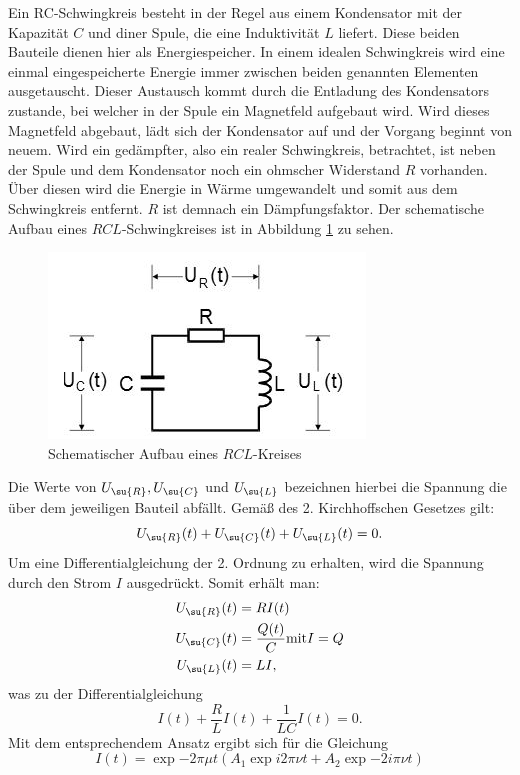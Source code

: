 Ein RC-Schwingkreis besteht in der Regel aus einem Kondensator mit der
Kapazität $C$ und diner Spule, die eine Induktivität $L$ liefert.
Diese beiden Bauteile dienen hier als Energiespeicher.
In einem idealen Schwingkreis wird eine einmal eingespeicherte Energie
immer zwischen beiden genannten Elementen ausgetauscht.
Dieser Austausch kommt durch die Entladung des Kondensators zustande, bei welcher
in der Spule ein Magnetfeld aufgebaut wird. Wird dieses Magnetfeld abgebaut,
lädt sich der Kondensator auf und der Vorgang beginnt von neuem.
Wird ein gedämpfter, also ein realer Schwingkreis, betrachtet, ist neben der
Spule und dem Kondensator noch ein ohmscher Widerstand $R$ vorhanden.
Über diesen wird die Energie in Wärme umgewandelt und somit aus dem
Schwingkreis entfernt. $R$ ist demnach ein Dämpfungsfaktor.
Der schematische Aufbau eines $RCL$-Schwingkreises ist in Abbildung \ref{fig:rcl}
zu sehen.
\begin{figure}[H]
  \centering
  \includegraphics{Bilder/RCL.JPG}
  \caption{Schematischer Aufbau eines $RCL$-Kreises\cite{354}}
  \label{fig:rcl}
\end{figure}
Die Werte von $U_\su{R}, U_\su{C}$ und $U_\su{L}$ bezeichnen hierbei die Spannung
die über dem jeweiligen Bauteil abfällt. Gemäß des 2. Kirchhoffschen Gesetzes
gilt:
\begin{equation}
  U_\su{R}(t) + U_\su{C}(t) + U_\su{L}(t) = 0.
  \label{eqn:kirch}
\end{equation}
Um eine Differentialgleichung der 2. Ordnung zu erhalten, wird die Spannung
durch den Strom $I$ ausgedrückt. Somit erhält man:
\begin{align*}
  U_\su{R}(t) &= RI(t) \\
  U_\su{C}(t) &= \frac{Q(t)}{C} \text{mit} I = Q \\
  U_\su{L}(t) &= LI ,
\end{align*}
was zu der Differentialgleichung
\begin{equation}
  I(t) + \frac{R}{L}I(t) + \frac{1}{LC}I(t) = 0 .
\end{equation}
Mit dem entsprechendem Ansatz ergibt sich für die Gleichung
\begin{equation}
  I(t)=\exp{-2\pi\mu t}(A_1\exp{i2\pi\nu t} + A_2\exp{-2i\pi\nu t})
\end{equation}
